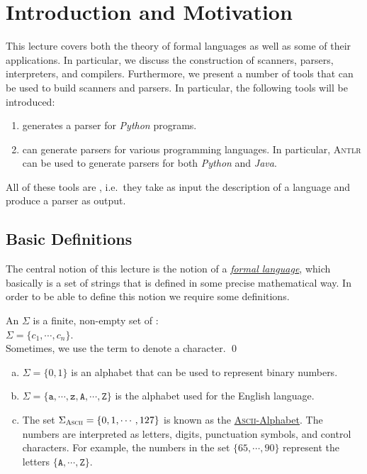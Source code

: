 \chapter{Introduction and Motivation}
This lecture covers both the theory of formal languages as well as some of their applications.
In particular, we discuss the construction of scanners, parsers, interpreters, and compilers.  Furthermore, we 
present a number of tools that can be used to build scanners and parsers.  In particular, 
the following tools will be introduced:
\begin{enumerate}
\item {}  generates a parser for \textsl{Python} programs. 
\item {}  can generate parsers for various programming languages.  In
      particular, \textsc{Antlr} can be used to generate parsers for both \textsl{Python} and \textsl{Java}.  
\end{enumerate}
All of these tools are , i.e.~they take as input the description of a
language and produce a parser as output. 

\section{Basic Definitions}
The central notion of this lecture is the notion of a 
\href{http://en.wikipedia.org/wiki/Formal_language}{\emph{formal language}},  which
basically is a set of strings that is defined in some precise mathematical way.  In order to be able to define
this notion we require some definitions.  

\begin{Definition}[Alphabet]
An  $\Sigma$  is a finite, non-empty set of :
\\[0.2cm]
\hspace*{1.3cm}
$\Sigma = \{ c_1, \cdots, c_n \}$. 
\\[0.2cm]
Sometimes, we use the term   to denote a character.
\qed
\end{Definition}

\examplesEng
\begin{enumerate}[(a)]
\item $\Sigma = \{ 0, 1\}$ is an alphabet that can be used to represent binary numbers.
\item $\Sigma = \{ \mathtt{a}, \cdots, \mathtt{z}, \mathtt{A}, \cdots, \mathtt{Z} \}$ 
      is the alphabet used for the English language.
\item The set $\Sigma_{\textsc{\scriptsize Ascii}} = \{ 0, 1, \cdots, 127 \}$ is known as the
      \href{http://en.wikipedia.org/wiki/ASCII}{\textsc{Ascii}-Alphabet}.  The numbers are
      interpreted as letters, digits, punctuation symbols, and control characters.
      For example, the numbers in the set $\{65, \cdots, 90 \}$ represent the letters
      $\{\mathtt{A}, \cdots, \mathtt{Z}\}$.  
      \eox
\end{enumerate}

